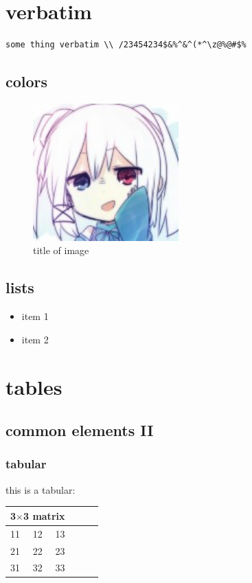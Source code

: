 \documentclass[11pt,a4paper]{book}
\begin{document}
\chapter{verbatim}
\begin{verbatim}
some thing verbatim \\ /23454234$&%^&^(*^\z@%@#$%
\end{verbatim}

\section{colors}
\begin{figure}[!h]
  \centering
  \begin{turn}{45}
    \includegraphics[width=0.5\textwidth,bb=0 0 140 132]{head_image.jpg}
  \end{turn}
  \caption{\color{tianyi_blue} title of image}
\end{figure}

\clearpage
\section{lists}
\begin{itemize}
\item item 1
\item item 2
\end{itemize}

\chapter{tables}
\section{common elements II}
\subsection{tabular}
this is a tabular: \\
\begin{tabular}{lcr||lcr}
  \hline
  \multicolumn{3}{|c|}{3$\times$3 matrix} \\
  \hline
  11 & 12 & 13 \\
  \hline
  21 & 22 & 23 \\
  \cline{1-2}
  31 & 32 & 33
\end{tabular}
\end{document}

